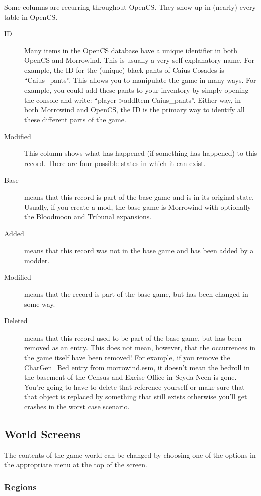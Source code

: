 Some columns are recurring throughout OpenCS. They show up in (nearly) every table in OpenCS.

\begin{description}
\item[ID] Many items in the OpenCS database have a unique identifier in both OpenCS and Morrowind. This is usually a very self-explanatory name. For example, the ID for the (unique) black pants of Caius Cosades is ``Caius\_pants''. This allows you to manipulate the game in many ways. For example, you could add these pants to your inventory by simply opening the console and write: ``player->addItem Caius\_pants''. Either way, in both Morrowind and OpenCS, the ID is the primary way to identify all these different parts of the game.
\item[Modified] This column shows what has happened (if something has happened) to this record. There are four possible states in which it can exist. 
\item[Base] means that this record is part of the base game and is in its original state. Usually, if you create a mod, the base game is Morrowind with optionally the Bloodmoon and Tribunal expansions.
\item[Added] means that this record was not in the base game and has been added by a modder.
\item[Modified] means that the record is part of the base game, but has been changed in some way.
\item[Deleted] means that this record used to be part of the base game, but has been removed as an entry. This does not mean, however, that the occurrences in the game itself have been removed! For example, if you remove the CharGen\_Bed entry from morrowind.esm, it doesn't mean the bedroll in the basement of the Census and Excise Office in Seyda Neen is gone. You're going to have to delete that reference yourself or make sure that that object is replaced by something that still exists otherwise you'll get crashes in the worst case scenario.
 \end{description}

\subsection{World Screens}

The contents of the game world can be changed by choosing one of the options in the appropriate menu at the top of the screen.

\subsubsection{Regions}

